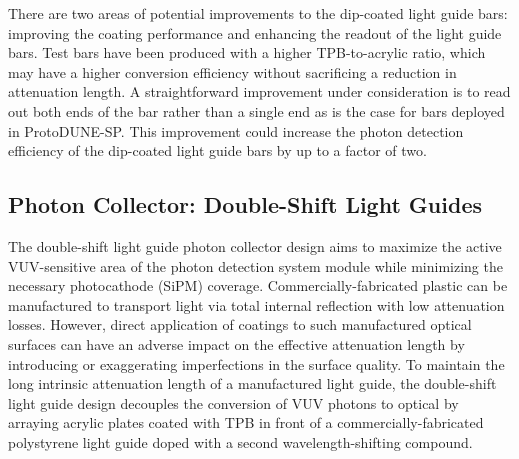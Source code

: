 



There are two areas of potential improvements to the dip-coated light guide bars: improving the coating performance and enhancing the readout of the light guide bars.  Test bars have been produced with a higher TPB-to-acrylic ratio, which may have a higher conversion efficiency without sacrificing a reduction in attenuation length.  A straightforward improvement under consideration is to read out both ends of the  bar rather than a single end as is the case for bars deployed in ProtoDUNE-SP.  This improvement could increase the photon detection efficiency of the dip-coated light guide bars by up to a factor of two.

\subsection{Photon Collector: Double-Shift Light Guides}
\label{ssec:fdsp-pd-pc-bar2}

The double-shift light guide photon collector design aims to maximize the active VUV-sensitive area of the photon detection system module while minimizing the necessary photocathode (SiPM) coverage. Commercially-fabricated plastic can be manufactured to transport light via total internal reflection with low attenuation losses. However, direct application of coatings to such manufactured optical surfaces can have an adverse impact on the effective attenuation length by introducing or exaggerating imperfections in the surface quality. To maintain the long intrinsic attenuation length of a manufactured light guide, the double-shift light guide design decouples the conversion of VUV photons to optical by arraying acrylic plates coated with TPB in front of a commercially-fabricated polystyrene light guide doped with a second wavelength-shifting compound.

